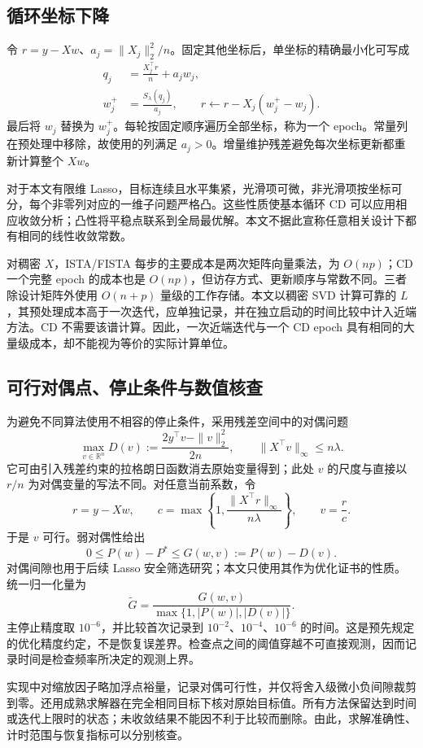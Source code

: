 \subsection{循环坐标下降}
令 $r=y-Xw$、$a_j=\|X_j\|_2^2/n$。固定其他坐标后，单坐标的精确最小化可写成\cite{friedman2010}
\begin{align}
  q_j&=\frac{X_j^\top r}{n}+a_jw_j,\nonumber\\
  w_j^+&=\frac{S_\lambda(q_j)}{a_j},\qquad
  r\leftarrow r-X_j(w_j^+-w_j).
  \label{eq:theory_cd}
\end{align}
最后将 $w_j$ 替换为 $w_j^+$。每轮按固定顺序遍历全部坐标，称为一个 epoch。常量列在预处理中移除，故使用的列满足 $a_j>0$。增量维护残差避免每次坐标更新都重新计算整个 $Xw$。

对于本文有限维 Lasso，目标连续且水平集紧，光滑项可微，非光滑项按坐标可分，每个非零列对应的一维子问题严格凸。这些性质使基本循环 CD 可以应用相应收敛分析；凸性将平稳点联系到全局最优解\cite{tseng2001}。本文不据此宣称任意相关设计下都有相同的线性收敛常数。

对稠密 $X$，ISTA/FISTA 每步的主要成本是两次矩阵向量乘法，为 $O(np)$；CD 一个完整 epoch 的成本也是 $O(np)$，但访存方式、更新顺序与常数不同。三者除设计矩阵外使用 $O(n+p)$ 量级的工作存储。本文以稠密 SVD 计算可靠的 $L$，其预处理成本高于一次迭代，应单独记录，并在独立启动的时间比较中计入近端方法。CD 不需要该谱计算。因此，一次近端迭代与一个 CD epoch 具有相同的大量级成本，却不能视为等价的实际计算单位。

\subsection{可行对偶点、停止条件与数值核查}
为避免不同算法使用不相容的停止条件，采用残差空间中的对偶问题
\begin{equation}
  \max_{v\in\mathbb{R}^n}
  D(v):=\frac{2y^\top v-\|v\|_2^2}{2n},
  \qquad \|X^\top v\|_\infty\leq n\lambda.
  \label{eq:theory_dual}
\end{equation}
它可由引入残差约束的拉格朗日函数消去原始变量得到；此处 $v$ 的尺度与直接以 $r/n$ 为对偶变量的写法不同。对任意当前系数，令
\begin{equation}
  r=y-Xw,\qquad
  c=\max\left\{1,\frac{\|X^\top r\|_\infty}{n\lambda}\right\},
  \qquad v=\frac{r}{c}.
  \label{eq:theory_dualscale}
\end{equation}
于是 $v$ 可行。弱对偶性给出
\begin{equation}
  0\leq P(w)-P^*\leq
  G(w,v):=P(w)-D(v).
  \label{eq:theory_gap}
\end{equation}
对偶间隙也用于后续 Lasso 安全筛选研究\cite{fercoq2015,ndiaye2017}；本文只使用其作为优化证书的性质。统一归一化量为
\begin{equation}
  \widetilde G=\frac{G(w,v)}{\max\{1,|P(w)|,|D(v)|\}}.
  \label{eq:theory_normalized_gap}
\end{equation}
主停止精度取 $10^{-6}$，并比较首次记录到 $10^{-2}$、$10^{-4}$、$10^{-6}$ 的时间。这是预先规定的优化精度约定，不是恢复误差界。检查点之间的阈值穿越不可直接观测，因而记录时间是检查频率所决定的观测上界。

实现中对缩放因子略加浮点裕量，记录对偶可行性，并仅将舍入级微小负间隙裁剪到零。还用成熟求解器在完全相同目标下核对原始目标值。所有方法保留达到时间或迭代上限时的状态；未收敛结果不能因不利于比较而删除。由此，求解准确性、计时范围与恢复指标可以分别核查。
